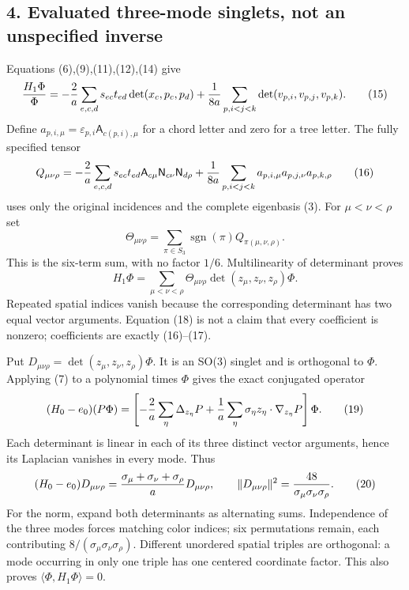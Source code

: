 \documentclass[
  11pt,
]{article}
\begin{document}
\subsection{4. Evaluated three-mode singlets, not an unspecified
inverse}\label{weak-coupling-part-15-evaluated-three-mode-singlets-not-an-unspecified-inverse}

Equations (6),(9),(11),(12),(14) give \[
 {H_1\Phi\over\Phi}
 =-{2\over a}\sum_{e,c,d}s_{ec}t_{ed}\det(x_c,p_c,p_d)
     +{1\over8a}\sum_{p,i<j<k}\det(v_{p,i},v_{p,j},v_{p,k}).
 \tag{15}
\] Define \(a_{p,i,\mu}=\varepsilon_{p,i}\mathsf A_{c(p,i),\mu}\) for a
chord letter and zero for a tree letter. The fully specified tensor \[
 Q_{\mu\nu\rho}=
 -{2\over a}\sum_{e,c,d}s_{ec}t_{ed}
                      \mathsf A_{c\mu}\mathsf N_{c\nu}\mathsf N_{d\rho}
 +{1\over8a}\sum_{p,i<j<k}
                         a_{p,i,\mu}a_{p,j,\nu}a_{p,k,\rho}
 \tag{16}
\] uses only the original incidences and the complete eigenbasis (3).
For \(\mu<\nu<\rho\) set \[
 \Theta_{\mu\nu\rho}
       =\sum_{\pi\in S_3}\operatorname{sgn}(\pi)
                   Q_{\pi(\mu,\nu,\rho)}.
 \tag{17}
\] This is the six-term sum, with no factor \(1/6\). Multilinearity of
determinant proves \[
 H_1\Phi=\sum_{\mu<\nu<\rho}
              \Theta_{\mu\nu\rho}\det(z_\mu,z_\nu,z_\rho)\Phi.
 \tag{18}
\] Repeated spatial indices vanish because the corresponding determinant
has two equal vector arguments. Equation (18) is not a claim that every
coefficient is nonzero; coefficients are exactly (16)--(17).

Put \(D_{\mu\nu\rho}=\det(z_\mu,z_\nu,z_\rho)\Phi\). It is an SO(3)
singlet and is orthogonal to \(\Phi\). Applying (7) to a polynomial
times \(\Phi\) gives the exact conjugated operator \[
 (H_0-e_0)(P\Phi)
 =\left[-{2\over a}\sum_\eta\Delta_{z_\eta}P
       +{1\over a}\sum_\eta\sigma_\eta z_\eta\cdot\nabla_{z_\eta}P\right]\Phi.
 \tag{19}
\] Each determinant is linear in each of its three distinct vector
arguments, hence its Laplacian vanishes in every mode. Thus \[
 (H_0-e_0)D_{\mu\nu\rho}
      ={\sigma_\mu+\sigma_\nu+\sigma_\rho\over a}D_{\mu\nu\rho},
 \qquad
 \|D_{\mu\nu\rho}\|^2={48\over\sigma_\mu\sigma_\nu\sigma_\rho}.
 \tag{20}
\] For the norm, expand both determinants as alternating sums.
Independence of the three modes forces matching color indices; six
permutations remain, each contributing \(8/(\sigma_\mu\sigma_\nu
\sigma_\rho)\). Different unordered spatial triples are orthogonal: a
mode occurring in only one triple has one centered coordinate factor.
This also proves \(\langle\Phi,H_1\Phi\rangle=0\).
\end{document}
